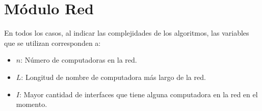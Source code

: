 \section{M\'{o}dulo Red}

  En todos los casos, al indicar las complejidades de los algoritmos, las variables que se utilizan corresponden a:
  \vspace{-0.5em}\begin{itemize}
    \item $n$: N\'umero de computadoras en la red.
    \item $L$: Longitud de nombre de computadora m\'as largo de la red.
    \item $I$: Mayor cantidad de interfaces que tiene alguna computadora en la red en el momento.
  \end{itemize}

